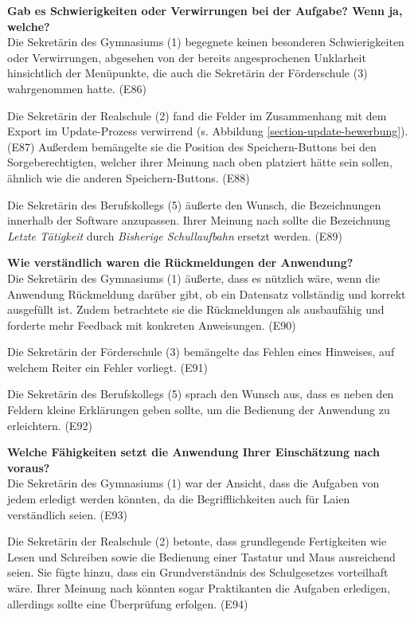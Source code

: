 \textbf{Gab es Schwierigkeiten oder Verwirrungen bei der Aufgabe? Wenn ja, welche?}\\
Die Sekretärin des Gymnasiums (1) begegnete keinen besonderen Schwierigkeiten oder Verwirrungen, abgesehen von der bereits angesprochenen Unklarheit hinsichtlich der Menüpunkte, die auch die Sekretärin der Förderschule (3) wahrgenommen hatte. (E86)

Die Sekretärin der Realschule (2) fand die Felder im Zusammenhang mit dem Export im Update-Prozess verwirrend (s. Abbildung \ref{section-update-bewerbung}). (E87) Außerdem bemängelte sie die Position des Speichern-Buttons bei den Sorgeberechtigten, welcher ihrer Meinung nach oben platziert hätte sein sollen, ähnlich wie die anderen Speichern-Buttons. (E88)

Die Sekretärin des Berufskollegs (5) äußerte den Wunsch, die Bezeichnungen innerhalb der Software anzupassen. Ihrer Meinung nach sollte die Bezeichnung \textit{Letzte Tätigkeit} durch \textit{Bisherige Schullaufbahn} ersetzt werden. (E89)

\textbf{Wie verständlich waren die Rückmeldungen der Anwendung?}\\
Die Sekretärin des Gymnasiums (1) äußerte, dass es nützlich wäre, wenn die Anwendung Rückmeldung darüber gibt, ob ein Datensatz vollständig und korrekt ausgefüllt ist. Zudem betrachtete sie die Rückmeldungen als \glqq ausbaufähig\grqq{}  und forderte mehr Feedback mit konkreten Anweisungen. (E90)

Die Sekretärin der Förderschule (3) bemängelte das Fehlen eines Hinweises, auf welchem Reiter ein Fehler vorliegt. (E91)

Die Sekretärin des Berufskollegs (5) sprach den Wunsch aus, dass es neben den Feldern kleine Erklärungen geben sollte, um die Bedienung der Anwendung zu erleichtern. (E92)

\textbf{Welche Fähigkeiten setzt die Anwendung Ihrer Einschätzung nach voraus?}\\
Die Sekretärin des Gymnasiums (1) war der Ansicht, dass die Aufgaben von jedem erledigt werden könnten, da die Begrifflichkeiten auch für Laien verständlich seien. (E93)

Die Sekretärin der Realschule (2) betonte, dass grundlegende Fertigkeiten wie Lesen und Schreiben sowie die Bedienung einer Tastatur und Maus ausreichend seien. Sie fügte hinzu, dass ein Grundverständnis des Schulgesetzes vorteilhaft wäre. Ihrer Meinung nach könnten sogar Praktikanten die Aufgaben erledigen, allerdings sollte eine Überprüfung erfolgen. (E94)


